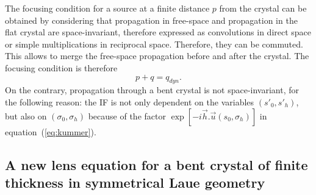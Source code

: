 \documentclass[preprint]{iucr}              %
\newcommand{\inred}[1]{{\color{red}#1}}
\begin{document}

\inred{
The focusing condition for a source at a finite distance $p$ from the crystal can be obtained by considering that propagation in free-space and propagation in the flat crystal are space-invariant, therefore expressed as convolutions in direct space or simple multiplications in reciprocal space. Therefore, they can be commuted. This allows to merge the free-space propagation before and after the crystal. The focusing condition is therefore
\begin{equation}
    p + q = q_{dyn}.
\end{equation}
On the contrary, propagation through a bent crystal is not space-invariant, for the following reason: the IF is not only dependent on the variables $(s'_0, s'_h)$, but also on $(\sigma_0, \sigma_h)$ because of the factor  
$\exp[-i \vec h . \vec u (s_0, \sigma_h)]$ in 
equation~(\ref{eq:kummer}). 
}


\subsection{\inred{A new} lens equation for a bent crystal of finite thickness in symmetrical Laue geometry}
\label{sec:LaueNewCLE}

\end{document}
